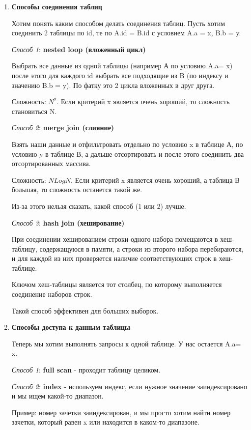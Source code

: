 \begin{enumerate}
    \item \textbf{Способы соединения таблиц }

Хотим понять каким способом делать соединения таблиц. Пусть хотим соединить 2 таблицы по id, те по A.id = B.id с условием A.a = x, B.b = y.

\textit{Способ 1}: \textbf{nested loop (вложенный цикл)}

Выбрать все данные из одной таблицы (например А по условию A.a= x) после этого для каждого id выбрать все подходящие из B (по индексу и значению B.b = y). По фатку это 2 цикла вложенных в друг друга.

Сложность: $N^2$. Если критерий x является очень хороший, то сложность становиться N. 

\textit{Способ 2}: \textbf{merge join (слияние)}

Взять наши данные и отфильтровать отдельно по условию x в таблице А, по условию y в таблице В, а дальше отсортировать и после этого соединить два отсортированных массива.

Сложность: $NLogN$. Если критерий x является очень хороший, а таблица В большая, то сложность останется такой же. 

Из-за этого нельзя сказать, какой способ (1 или 2) лучше. 

\textit{Способ 3}: \textbf{hash join (хеширование)}

При соединении хешированием строки одного набора помещаются в
хеш-таблицу, содержащуюся в памяти, а строки из второго набора
перебираются, и для каждой из них проверяется наличие
соответствующих строк в хеш-таблице.

Ключом хеш-таблицы является тот столбец, по которому выполняется
соединение наборов строк.

Такой способ эффективен для больших выборок. 

\item  \textbf{Способы доступа к данным таблицы}

Теперь мы хотим выполнять запросы к одной таблице. У нас остается A.a= x. 

\textit{Способ 1}: \textbf{full scan} - проходит таблицу целиком. 

\textit{Способ 2}: \textbf{index} - используем индекс, если нужное значение заиндексировано и мы ищем какой-то диапазон. 

Пример: номер зачетки заиндексирован, и мы просто хотим найти номер зачетки, который равен x или находится в каком-то диапазоне. 


\end{enumerate}

